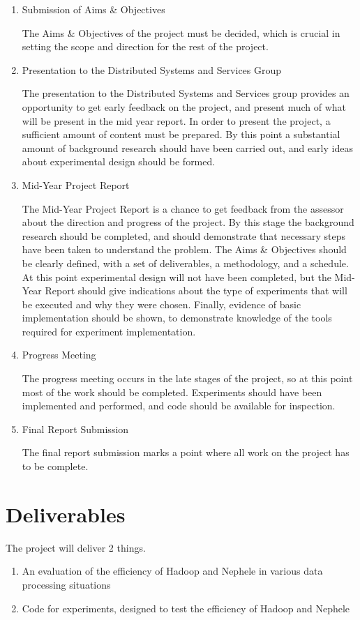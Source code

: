 \begin{enumerate}
	\item Submission of Aims \& Objectives

	The Aims \& Objectives of the project must be decided, which is crucial in setting the scope and direction for the rest of the project.

	\item Presentation to the Distributed Systems and Services Group

	The presentation to the Distributed Systems and Services group provides an opportunity to get early feedback on the project, and present much of what will be present in the mid year report. In order to present the project, a sufficient amount of content must be prepared. By this point a substantial amount of background research should have been carried out, and early ideas about experimental design should be formed.

	\item Mid-Year Project Report

	The Mid-Year Project Report is a chance to get feedback from the assessor about the direction and progress of the project. By this stage the background research should be completed, and should demonstrate that necessary steps have been taken to understand the problem. The Aims \& Objectives should be clearly defined, with a set of deliverables, a methodology, and a schedule. At this point experimental design will not have been completed, but the Mid-Year Report should give indications about the type of experiments that will be executed and why they were chosen. Finally, evidence of basic implementation should be shown, to demonstrate knowledge of the tools required for experiment implementation. 

	\item Progress Meeting

	The progress meeting occurs in the late stages of the project, so at this point most of the work should be completed. Experiments should have been implemented and performed, and code should be available for inspection.

	\item Final Report Submission
	
	The final report submission marks a point where all work on the project has to be complete. 
\end{enumerate}

\section{Deliverables}
The project will deliver 2 things.

\begin{enumerate}
	\item An evaluation of the efficiency of Hadoop and Nephele in various data processing situations
	\item Code for experiments, designed to test the efficiency of Hadoop and Nephele
\end{enumerate}